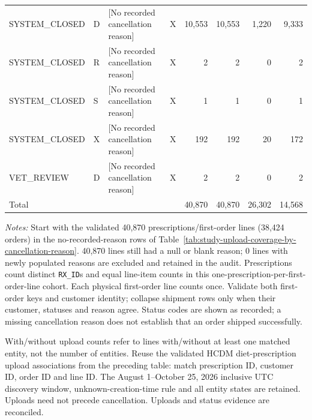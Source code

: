 \begin{table}[htbp]
\begin{tabular}{llllrrrr}
SYSTEM\_CLOSED & D & [No recorded cancellation reason] & X & 10,553 & 10,553 & 1,220 & 9,333 \\

SYSTEM\_CLOSED & R & [No recorded cancellation reason] & X & 2 & 2 & 0 & 2 \\

SYSTEM\_CLOSED & S & [No recorded cancellation reason] & X & 1 & 1 & 0 & 1 \\

SYSTEM\_CLOSED & X & [No recorded cancellation reason] & X & 192 & 192 & 20 & 172 \\

VET\_REVIEW & D & [No recorded cancellation reason] & X & 2 & 2 & 0 & 2 \\
\midrule
\multicolumn{4}{l}{Total} & 40,870 & 40,870 & 26,302 & 14,568 \\
\bottomrule
\end{tabular}
\begin{minipage}{\linewidth}
\footnotesize
\textit{Notes:} Start with the validated 40,870 prescriptions/first-order lines
(38,424 orders) in the no-recorded-reason rows of
Table~\ref{tab:study-upload-coverage-by-cancellation-reason}.
40,870 lines still had a null or blank reason;
0 lines with newly populated reasons are excluded and retained in the audit.
Prescriptions count distinct \texttt{RX\_ID}s and equal line-item counts in this
one-prescription-per-first-order-line cohort. Each physical first-order line
counts once. Validate both first-order keys and
customer identity; collapse shipment rows only when their customer, statuses and
reason agree. Status codes are shown as recorded; a missing cancellation reason
does not establish that an order shipped successfully.

With/without upload counts refer to lines with/without at least one matched
entity, not the number of entities. Reuse the validated HCDM diet-prescription
upload associations from the preceding table: match prescription ID, customer ID,
order ID and line ID. The August 1--October 25, 2026 inclusive UTC discovery window,
unknown-creation-time rule and all entity states are retained. Uploads need not
precede cancellation. Uploads and status evidence are reconciled.
\end{minipage}
\end{table}